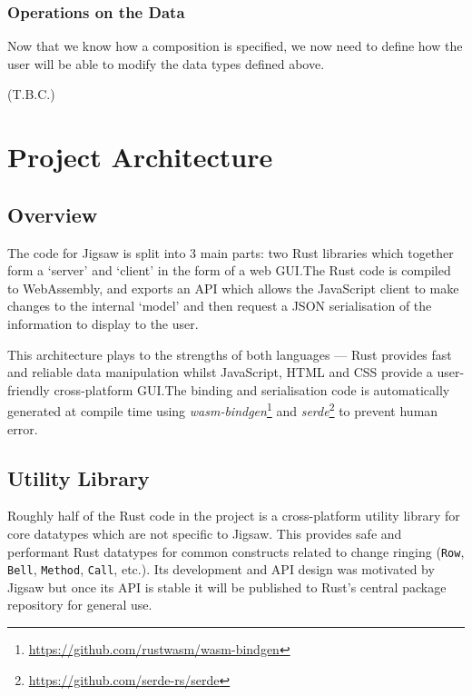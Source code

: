 \documentclass[12pt]{article}
\newcommand{\footurl}[1]{\footnote{\url{#1}}}
\begin{document}
\subsubsection{Operations on the Data}

Now that we know how a composition is specified, we now need to define how the user will be able to
modify the data types defined above.

(T.B.C.)



\pagebreak

\section{Project Architecture}\label{sec:proj_arch}

\subsection{Overview}

The code for Jigsaw is split into 3 main parts: two Rust libraries which together form a `server'
and `client' in the form of a web GUI.\@  The Rust code is compiled to WebAssembly, and exports an
API which allows the JavaScript client to make changes to the internal `model' and then request a
JSON serialisation of the information to display to the user.

This architecture plays to the strengths of both languages --- Rust provides fast and reliable data
manipulation whilst JavaScript, HTML and CSS provide a user-friendly cross-platform GUI.\@  The
binding and serialisation code is automatically generated at compile time using
\emph{wasm-bindgen}\footurl{https://github.com/rustwasm/wasm-bindgen} and
\emph{serde}\footurl{https://github.com/serde-rs/serde} to prevent human error.

\subsection{Utility Library}

Roughly half of the Rust code in the project is a cross-platform utility library for core datatypes
which are not specific to Jigsaw.  This provides safe and performant Rust datatypes for common
constructs related to change ringing (\verb|Row|, \verb|Bell|, \verb|Method|, \verb|Call|, etc.).
Its development and API design was motivated by Jigsaw but once its API is stable it will be
published to Rust's central package repository for general use.
\end{document}
